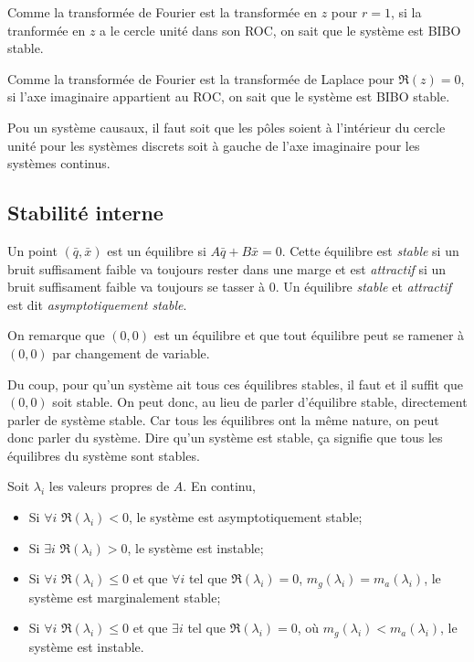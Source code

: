 Comme la transformée de Fourier
est la transformée en $z$ pour $r = 1$,
si la tranformée en $z$ a le cercle unité dans son ROC, on sait
que le système est BIBO stable.

Comme la transformée de Fourier est la transformée de Laplace pour $\Re(z) = 0$,
si l'axe imaginaire appartient au ROC, on sait
que le système est BIBO stable.

Pou un système causaux, il faut soit que les pôles soient
à l'intérieur du cercle unité pour les systèmes discrets soit
à gauche de l'axe imaginaire pour les systèmes continus.

\subsection{Stabilité interne}
Un point $(\bar{q}, \bar{x})$ est un équilibre si $A\bar{q} + B\bar{x} = 0$.
Cette équilibre est \emph{stable} si un bruit suffisament faible
va toujours rester dans une marge et est \emph{attractif} si
un bruit suffisament faible va toujours se tasser à 0.
Un équilibre \emph{stable} et \emph{attractif}
est dit \emph{asymptotiquement stable}.

On remarque que $(0,0)$ est un équilibre et que tout équilibre peut se
ramener à $(0,0)$ par changement de variable.

Du coup, pour qu'un système ait tous ces équilibres stables,
il faut et il suffit que $(0,0)$ soit stable.
On peut donc, au lieu de parler d'équilibre stable,
directement parler de système stable.
Car tous les équilibres ont la même nature,
on peut donc parler du système.
Dire qu'un système est stable,
ça signifie que tous les équilibres du système sont stables.

Soit $\lambda_i$ les valeurs propres de $A$.
En continu,
\begin{itemize}
  \item Si $\forall i$ $\Re(\lambda_i) < 0$, le système est asymptotiquement
    stable;
  \item Si $\exists i$ $\Re(\lambda_i) > 0$, le système est instable;
  \item Si $\forall i$ $\Re(\lambda_i) \leq 0$ et que $\forall i$ tel que
    $\Re(\lambda_i) = 0$, $m_g(\lambda_i) = m_a(\lambda_i)$,
    le système est marginalement stable;
  \item Si $\forall i$ $\Re(\lambda_i) \leq 0$ et que $\exists i$ tel que
    $\Re(\lambda_i) = 0$, où $m_g(\lambda_i) < m_a(\lambda_i)$,
    le système est instable.
\end{itemize}

